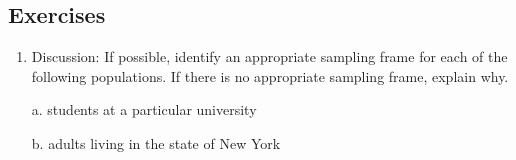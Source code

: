 \subsection{Exercises}

\begin{fullwidth}

\begin{enumerate}

\item  Discussion: If possible, identify an appropriate sampling frame for each of the following populations. If there is no appropriate sampling frame, explain why.

a. students at a particular university

b. adults living in the state of New York

\end{enumerate}

\end{fullwidth}
